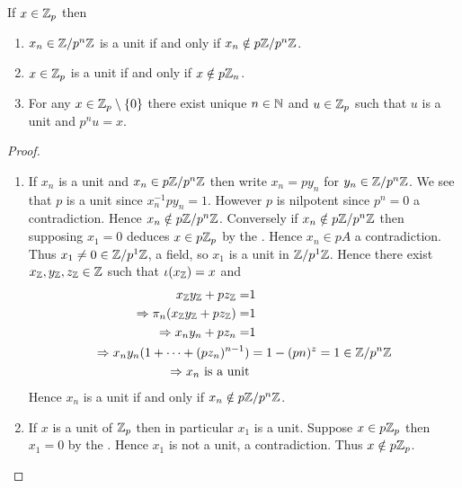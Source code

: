 \begin{prop}
    If $x \in \mathbb{Z}_p$ then
    \begin{enumerate}
        \item $x_n \in \mathbb{Z}/p^{n}\mathbb{Z}$ is a unit if and only if $x_n \notin p \mathbb{Z}/p^{n}\mathbb{Z}$.
        \item $x \in \mathbb{Z}_p$ is a unit if and only if $x \notin p \mathbb{Z}_n$.
        \item For any $ x \in \mathbb{Z}_p \setminus \left\{0\right\}$ there exist 
            unique $n \in \mathbb{N}$ and $u \in \mathbb{Z}_p$ such that
            $u$ is a unit and $p^n u = x$.
    \end{enumerate}
\end{prop}
\begin{proof}~
    \begin{enumerate}
        \item If $x_n$ is a unit and $x_n \in p \mathbb{Z}/p^{n}\mathbb{Z}$ then
            write $x_n = p y_n $ for $y_n \in \mathbb{Z}/p^{n}\mathbb{Z}$.
            We see that $p$ is a unit since $x_n ^{-1} p y_n = 1$.
            However $p$ is nilpotent since $p^n = 0$ a contradiction.
            Hence $x_n \notin p \mathbb{Z}/p^{n}\mathbb{Z}$.
            Conversely if $x_n \notin p \mathbb{Z}/p^{n}\mathbb{Z}$ then
            supposing $x_1 = 0$ deduces $x \in p \mathbb{Z}_p$ by 
            the .
            Hence $x_n \in p A$ a contradiction.
            Thus $x_1 \ne 0 \in \mathbb{Z}/p^{1}\mathbb{Z}$, a field,
            so $x_1$ is a unit in $\mathbb{Z}/p^{1}\mathbb{Z}$.
            Hence there exist $x_{\mathbb{Z}},y_{\mathbb{Z}},z_{\mathbb{Z}} \in \mathbb{Z}$
            such that $\iota(x_{\mathbb{Z}}) = x$ and 
            \begin{align*}
                x_{\mathbb{Z}} y_{\mathbb{Z}} + p z_{\mathbb{Z}} =& 1 \\
                \Rightarrow \pi_n(x_{\mathbb{Z}} y_{\mathbb{Z}} + p z_{\mathbb{Z}}) =& 1\\
                \Rightarrow x_n y_n + p z_n =& 1\\
                \Rightarrow x_n y_n (1 + \dots + (p z_n)^{n-1}) &= 
                1 - (pn)^z = 1 \in \mathbb{Z}/p^{n}\mathbb{Z}\\
                \Rightarrow x_n \text{ is a unit}
            \end{align*}
            Hence $x_n$ is a unit if and only if $x_n \notin p \mathbb{Z}/p^{n}\mathbb{Z}$.
        \item If $x$ is a unit of $\mathbb{Z}_p$
            then in particular $x_1$ is a unit.
            Suppose $x \in p \mathbb{Z}_p$ then $x_1 = 0$ by the 
            .
            Hence $x_1$ is not a unit, a contradiction.
            Thus $x \notin p \mathbb{Z}_p$.
            

\end{enumerate}
\end{proof}
